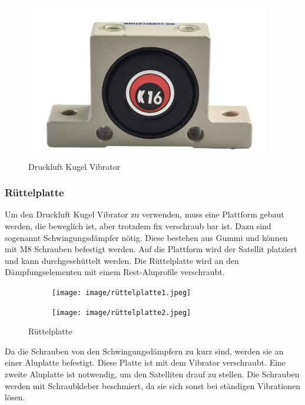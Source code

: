 \begin{figure}[H]
    \centering
    \includegraphics{image/vibration.jpeg}
    \caption{Druckluft Kugel Vibrator\autocite{PneumatischerVibrator}}
    \label{fig:enter-label}
\end{figure}
\subsubsection{Rüttelplatte}
Um den Druckluft Kugel Vibrator zu verwenden, muss eine Plattform gebaut werden, die beweglich ist, aber trotzdem fix verschraub bar ist.  Dazu sind sogenannt Schwingungsdämpfer nötig. Diese bestehen aus  Gummi und können mit M8 Schrauben befestigt werden. Auf die Plattform wird der Satellit platziert und kann durchgeschüttelt werden.
Die Rüttelplatte wird an den Dämpfungselementen mit einem Rest-Aluprofile verschraubt. \\
\vspace{3mm}
\begin{figure}[H]
    \centering
    \begin{subfigure}[b]{0.4\textwidth}
        \centering
        \texttt{[image: image/rüttelplatte1.jpeg]}
        
        \label{fig:bild1}
    \end{subfigure}
    \hfill
    \begin{subfigure}[b]{0.47\textwidth}
        \centering
        \texttt{[image: image/rüttelplatte2.jpeg]}
        
        \label{fig:bild2}
    \end{subfigure}
    \caption{Rüttelplatte}
    \label{fig:zwei_bilder}
\end{figure}
\vspace{3mm}
Da die Schrauben von den Schwingungsdämpfern zu kurz sind, werden sie an einer Aluplatte befestigt. Diese Platte ist mit dem Vibrator verschraubt. Eine zweite Aluplatte ist notwendig, um den Satelliten drauf zu stellen. Die Schrauben werden mit Schraubkleber beschmiert, da sie sich sonst bei ständigen Vibrationen lösen.